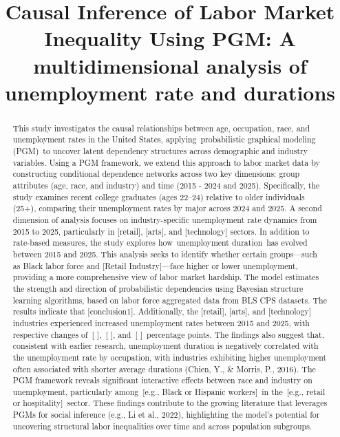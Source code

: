 \documentclass[
]{agujournal2019}
\begin{document}
\title{Causal Inference of Labor Market Inequality Using PGM: A
multidimensional analysis of unemployment rate and durations}




\begin{abstract}
This study investigates the causal relationships between age,
occupation, race, and unemployment rates in the United States,
applying~probabilistic graphical modeling (PGM)~to uncover latent
dependency structures across demographic and industry variables. Using a
PGM framework, we extend this approach to labor market data by
constructing conditional dependence networks across two key dimensions:
group attributes (age, race, and industry) and time (2015 - 2024 and
2025). Specifically, the study examines recent college graduates (ages
22--24) relative to older individuals (25+), comparing their
unemployment rates by major across 2024 and 2025. A second dimension of
analysis focuses on industry-specific unemployment rate dynamics from
2015 to 2025, particularly in {[}retail{]}, {[}arts{]}, and
{[}technology{]} sectors. In addition to rate-based measures, the study
explores how~unemployment duration~has evolved between 2015 and 2025.
This analysis seeks to identify whether certain groups---such as Black
labor force and {[}Retail Industry{]}---face higher or lower
unemployment, providing a more comprehensive view of labor market
hardship. The model estimates the strength and direction of
probabilistic dependencies using Bayesian structure learning algorithms,
based on labor force aggregated data from BLS CPS datasets. The results
indicate that {[}conclusion1{]}. Additionally, the {[}retail{]},
{[}arts{]}, and {[}technology{]} industries experienced increased
unemployment rates between 2015 and 2025, with respective changes of~{[}
{]},~{[} {]}, and~{[} {]}~percentage points. The findings also suggest
that, consistent with earlier research, unemployment duration is
negatively correlated with the unemployment rate by occupation, with
industries exhibiting higher unemployment often associated with shorter
average durations (Chien, Y., \& Morris, P., 2016). The PGM framework
reveals significant interactive effects between race and industry on
unemployment, particularly among~{[}e.g., Black or Hispanic
workers{]}~in the~{[}e.g., retail or hospitality{]}~sector. These
findings contribute to the growing literature that leverages PGMs for
social inference (e.g., Li et al., 2022), highlighting the model's
potential for uncovering structural labor inequalities over time and
across population subgroups.
\end{abstract}
\end{document}
